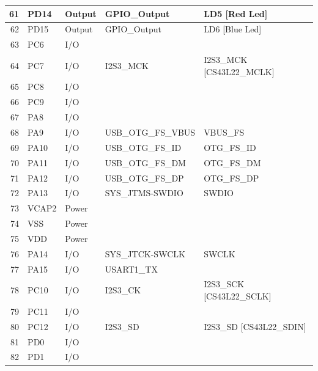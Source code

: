\documentclass[12pt,a4paper]{report}
\begin{document}
\begin{longtable}[c]{|r|l|l|r|r|}
		\hline
		61    & PD14  & Output & \multicolumn{1}{l|}{GPIO\_Output} & \multicolumn{1}{l|}{LD5 [Red Led]} \\
		\hline
		62    & PD15  & Output & \multicolumn{1}{l|}{GPIO\_Output} & \multicolumn{1}{l|}{LD6 [Blue Led]} \\
		\hline
		63    & PC6   & I/O   &       &  \\
		\hline
		64    & PC7   & I/O   & \multicolumn{1}{l|}{I2S3\_MCK} & \multicolumn{1}{l|}{I2S3\_MCK [CS43L22\_MCLK]} \\
		\hline
		65    & PC8   & I/O   &       &  \\
		\hline
		66    & PC9   & I/O   &       &  \\
		\hline
		67    & PA8   & I/O   &       &  \\
		\hline
		68    & PA9   & I/O   & \multicolumn{1}{l|}{USB\_OTG\_FS\_VBUS} & \multicolumn{1}{l|}{VBUS\_FS} \\
		\hline
		69    & PA10  & I/O   & \multicolumn{1}{l|}{USB\_OTG\_FS\_ID} & \multicolumn{1}{l|}{OTG\_FS\_ID} \\
		\hline
		70    & PA11  & I/O   & \multicolumn{1}{l|}{USB\_OTG\_FS\_DM} & \multicolumn{1}{l|}{OTG\_FS\_DM} \\
		\hline
		71    & PA12  & I/O   & \multicolumn{1}{l|}{USB\_OTG\_FS\_DP} & \multicolumn{1}{l|}{OTG\_FS\_DP} \\
		\hline
		72    & PA13  & I/O   & \multicolumn{1}{l|}{SYS\_JTMS-SWDIO} & \multicolumn{1}{l|}{SWDIO} \\
		\hline
		73    & VCAP2 & Power &       &  \\
		\hline
		74    & VSS   & Power &       &  \\
		\hline
		75    & VDD   & Power &       &  \\
		\hline
		76    & PA14  & I/O   & \multicolumn{1}{l|}{SYS\_JTCK-SWCLK} & \multicolumn{1}{l|}{SWCLK} \\
		\hline
		77    & PA15  & I/O   & \multicolumn{1}{l|}{USART1\_TX} &  \\
		\hline
		78    & PC10  & I/O   & \multicolumn{1}{l|}{I2S3\_CK} & \multicolumn{1}{l|}{I2S3\_SCK [CS43L22\_SCLK]} \\
		\hline
		79    & PC11  & I/O   &       &  \\
		\hline
		80    & PC12  & I/O   & \multicolumn{1}{l|}{I2S3\_SD} & \multicolumn{1}{l|}{I2S3\_SD [CS43L22\_SDIN]} \\
		\hline
		81    & PD0   & I/O   &       &  \\
		\hline
		82    & PD1   & I/O   &       &  \\

\end{longtable}
\end{document}
